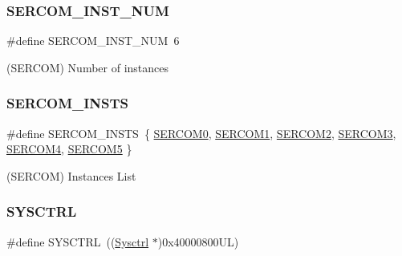 \subsubsection{\texorpdfstring{SERCOM\_INST\_NUM}{SERCOM\_INST\_NUM}}
{\footnotesize\ttfamily \#define S\+E\+R\+C\+O\+M\+\_\+\+I\+N\+S\+T\+\_\+\+N\+UM~6}



(S\+E\+R\+C\+OM) Number of instances 

\mbox{\label{group___s_a_m_d21_g15_l__base_gadb03dbe1ef2a3400f0a16b58948053a7}} 
\subsubsection{\texorpdfstring{SERCOM\_INSTS}{SERCOM\_INSTS}}
{\footnotesize\ttfamily \#define S\+E\+R\+C\+O\+M\+\_\+\+I\+N\+S\+TS~\{ \mbox{\hyperlink{group___s_a_m_d21_j18_a__base_gae5473788457bad0e69ad9d7f22ed404f}{S\+E\+R\+C\+O\+M0}}, \mbox{\hyperlink{group___s_a_m_d21_j18_a__base_ga130d7d7bc9ef1da1ba1bd094b42449d7}{S\+E\+R\+C\+O\+M1}}, \mbox{\hyperlink{group___s_a_m_d21_j18_a__base_ga918e4c85993961a115bb23b4bb73a87f}{S\+E\+R\+C\+O\+M2}}, \mbox{\hyperlink{group___s_a_m_d21_j18_a__base_gac9f8240be5a40b46cb09617323ebc7e3}{S\+E\+R\+C\+O\+M3}}, \mbox{\hyperlink{group___s_a_m_d21_j18_a__base_gad48343faa88820b8f552aa1eaf66f00a}{S\+E\+R\+C\+O\+M4}}, \mbox{\hyperlink{group___s_a_m_d21_j18_a__base_ga8785a316e608cb0a218f2a59655d6037}{S\+E\+R\+C\+O\+M5}} \}}



(S\+E\+R\+C\+OM) Instances List 

\mbox{\label{group___s_a_m_d21_g15_l__base_gaf94c5196d5506d0a34a0938d9bdb480f}} 
\subsubsection{\texorpdfstring{SYSCTRL}{SYSCTRL}}
{\footnotesize\ttfamily \#define S\+Y\+S\+C\+T\+RL~((\mbox{\hyperlink{struct_sysctrl}{Sysctrl}}  $\ast$)0x40000800\+U\+L)}



